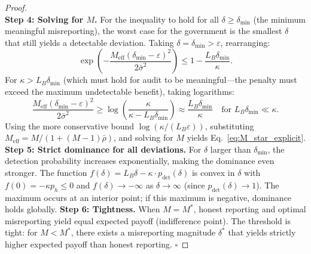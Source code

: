 \documentclass[11pt,a4paper]{article}
\theoremstyle{definition}
\begin{document}
\begin{proof}
\begin{equation}
    \label{eq:sufficient_condition}
\end{equation}
\textbf{Step 4: Solving for $M$.} For the inequality to hold for all $\delta \geq \delta_{\min}$ (the minimum meaningful misreporting), the worst case for the government is the smallest $\delta$ that still yields a detectable deviation. Taking $\delta = \delta_{\min} > \varepsilon$, rearranging:
\begin{equation}
    \exp\left(-\frac{M_{\mathrm{eff}} (\delta_{\min} - \varepsilon)^2}{2\bar{\sigma}^2}\right) \leq 1 - \frac{L_B \delta_{\min}}{\kappa}.
    \label{eq:exp_bound}
\end{equation}
For $\kappa > L_B \delta_{\min}$ (which must hold for audit to be meaningful---the penalty must exceed the maximum undetectable benefit), taking logarithms:
\begin{equation}
    \frac{M_{\mathrm{eff}} (\delta_{\min} - \varepsilon)^2}{2\bar{\sigma}^2} \geq \log\left(\frac{\kappa}{\kappa - L_B \delta_{\min}}\right) \approx \frac{L_B \delta_{\min}}{\kappa} \quad \text{for } L_B \delta_{\min} \ll \kappa.
    \label{eq:M_condition}
\end{equation}
Using the more conservative bound $\log(\kappa / (L_B \varepsilon))$, substituting $M_{\mathrm{eff}} = M / (1 + (M-1)\bar{\rho})$, and solving for $M$ yields Eq.~\eqref{eq:M_star_explicit}.
\textbf{Step 5: Strict dominance for all deviations.} For $\delta$ larger than $\delta_{\min}$, the detection probability increases exponentially, making the dominance even stronger. The function $f(\delta) = L_B \delta - \kappa \cdot p_{\mathrm{det}}(\delta)$ is convex in $\delta$ with $f(0) = -\kappa p_h \leq 0$ and $f(\delta) \to -\infty$ as $\delta \to \infty$ (since $p_{\mathrm{det}}(\delta) \to 1$). The maximum occurs at an interior point; if this maximum is negative, dominance holds globally.
\textbf{Step 6: Tightness.} When $M = M^*$, honest reporting and optimal misreporting yield equal expected payoff (indifference point). The threshold is tight: for $M < M^*$, there exists a misreporting magnitude $\delta^*$ that yields strictly higher expected payoff than honest reporting. $\square$
\end{proof}
\end{document}
